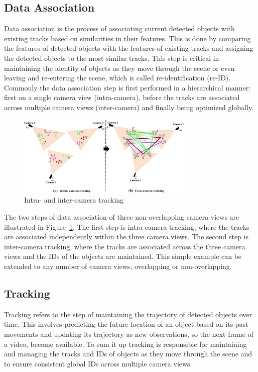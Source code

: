 \subsection{Data Association}\label{subsec:data_association}
Data association is the process of associating current detected objects with existing tracks based on similarities in their features. This is done by comparing the features of detected objects with the features of existing tracks and assigning the detected objects to the most similar tracks. This step is critical in maintaining the identity of objects as they move through the scene or even leaving and re-entering the scene, which is called re-identification (re-ID). Commonly the data association step is first performed in a hierarchical manner: first on a single camera view (intra-camera), before the tracks are associated across multiple camera views (inter-camera) and finally being optimized globally.

\begin{figure}[ht]
    \centering
    \includegraphics[width=0.75\textwidth]{resources/fig/Tesfaye19-intra_inter_camera_tracking.png}
    \caption{Intra- and inter-camera tracking~\cite[Fig.~1]{Tesfaye19}}\label{fig:intra_inter_camera_tracking}
\end{figure}

The two steps of data association of three non-overlapping camera views are illustrated in Figure~\ref{fig:intra_inter_camera_tracking}. The first step is intra-camera tracking, where the tracks are associated independently within the three camera views. The second step is inter-camera tracking, where the tracks are associated across the three camera views and the IDs of the objects are maintained. This simple example can be extended to any number of camera views, overlapping or non-overlapping.

\subsection{Tracking}\label{subsec:tracking}
Tracking refers to the step of maintaining the trajectory of detected objects over time. This involves predicting the future location of an object based on its past movements and updating its trajectory as new observations, so the next frame of a video, become available. To sum it up tracking is responsible for maintaining and managing the tracks and IDs of objects as they move through the scene and to ensure consistent global IDs across multiple camera views.

